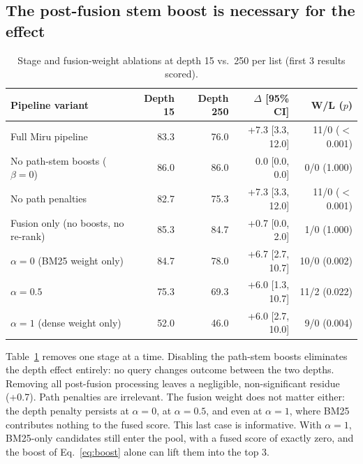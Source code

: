 \documentclass[11pt, letterpaper]{article}
\begin{document}
\subsection{The post-fusion stem boost is necessary for the effect}\label{sec:stages}
\begin{table}[htbp]
\centering\small
\caption{Stage and fusion-weight ablations at depth 15 vs.\ 250 per list (first 3 results scored).}
\label{tab:stages}
\begin{tabular}{@{}lrrrr@{}}
\toprule
Pipeline variant & Depth 15 & Depth 250 & $\Delta$ [95\% CI] & W/L ($p$) \\
\midrule
Full Miru pipeline & 83.3 & 76.0 & +7.3 [3.3, 12.0] & 11/0 ($<$0.001) \\
No path-stem boosts ($\beta{=}0$) & 86.0 & 86.0 & 0.0 [0.0, 0.0] & 0/0 (1.000) \\
No path penalties & 82.7 & 75.3 & +7.3 [3.3, 12.0] & 11/0 ($<$0.001) \\
Fusion only (no boosts, no re-rank) & 85.3 & 84.7 & +0.7 [0.0, 2.0] & 1/0 (1.000) \\
\midrule
$\alpha = 0$ (BM25 weight only) & 84.7 & 78.0 & +6.7 [2.7, 10.7] & 10/0 (0.002) \\
$\alpha = 0.5$ & 75.3 & 69.3 & +6.0 [1.3, 10.7] & 11/2 (0.022) \\
$\alpha = 1$ (dense weight only) & 52.0 & 46.0 & +6.0 [2.7, 10.0] & 9/0 (0.004) \\
\bottomrule
\end{tabular}
\end{table}

Table~\ref{tab:stages} removes one stage at a time. Disabling the path-stem boosts eliminates the depth effect
entirely: no query changes outcome between the two depths. Removing all post-fusion processing leaves a negligible,
non-significant residue (+0.7). Path penalties are irrelevant. The fusion weight does not matter either: the depth
penalty persists at $\alpha{=}0$, at $\alpha{=}0.5$, and even at $\alpha{=}1$, where BM25 contributes nothing to the
fused score. This last case is informative. With $\alpha{=}1$, BM25-only candidates still enter the pool, with a fused
score of exactly zero, and the boost of Eq.~\eqref{eq:boost} alone can lift them into the top 3.
\end{document}

